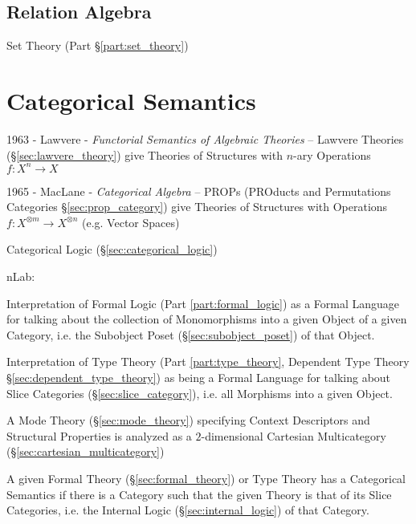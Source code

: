 \subsection{Relation Algebra}\label{sec:relation_algebra}

Set Theory (Part \S\ref{part:set_theory})



\section{Categorical Semantics}\label{sec:categorical_semantics}

1963 - Lawvere - \emph{Functorial Semantics of Algebraic Theories} -- Lawvere
Theories (\S\ref{sec:lawvere_theory}) give Theories of Structures with $n$-ary
Operations $f : X^n \rightarrow X$

1965 - MacLane - \emph{Categorical Algebra} -- PROPs (PROducts and Permutations
Categories \S\ref{sec:prop_category}) give Theories of Structures with
Operations $f : X^{\otimes m} \rightarrow X^{\otimes n}$ (e.g. Vector Spaces)

\fist Categorical Logic (\S\ref{sec:categorical_logic})

nLab:

Interpretation of Formal Logic (Part \ref{part:formal_logic}) as a
Formal Language for talking about the collection of Monomorphisms into
a given Object of a given Category, i.e. the Subobject Poset
(\S\ref{sec:subobject_poset}) of that Object.

Interpretation of Type Theory (Part \ref{part:type_theory}, Dependent
Type Theory \S\ref{sec:dependent_type_theory}) as being a Formal
Language for talking about Slice Categories
(\S\ref{sec:slice_category}), i.e. all Morphisms into a given Object.

A Mode Theory (\S\ref{sec:mode_theory}) specifying Context Descriptors
and Structural Properties is analyzed as a $2$-dimensional Cartesian
Multicategory (\S\ref{sec:cartesian_multicategory})

A given Formal Theory (\S\ref{sec:formal_theory}) or Type Theory has a
Categorical Semantics if there is a Category such that the given
Theory is that of its Slice Categories, i.e. the Internal Logic
(\S\ref{sec:internal_logic}) of that Category.


